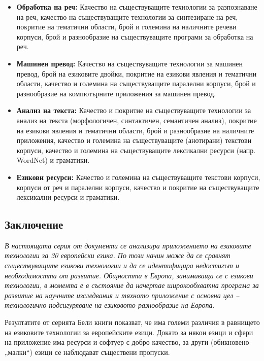 \documentclass[]{../../metanetpaper}
\begin{document}
\begin{multicols}{2}
\begin{itemize}
\item \textbf{Обработка на реч:} Качество на съществуващите технологии
  за разпознаване на реч, качество на съществуващите технологии за
  синтезиране на реч, покритие на тематични области, брой и големина
  на наличните речеви корпуси, брой и разнообразие на съществуващите
  програми за обработка на реч.
\item \textbf{Машинен превод:} Качество на съществуващите технологии
  за машинен превод, брой на езиковите двойки, покритие на езикови
  явления и тематични области, качество и големина на съществуващите
  паралелни корпуси, брой и разнообразие на компютърните приложения за
  машинен превод.
\item \textbf{Анализ на текста:} Качество и покритие на съществуващите
  технологии за анализ на текста (морфологичен, синтактичен,
  семантичен анализ), покритие на езикови явления и тематични области,
  брой и разнообразие на наличните приложения, качество и големина на
  съществуващите (анотирани) текстови корпуси, качество и големина на
  съществуващите лексикални ресурси (напр. WordNet) и граматики.
\item \textbf{Езикови ресурси:} Качество и големина на съществуващите
  текстови корпуси, корпуси от реч и паралелни корпуси, качество и
  покритие на съществуващите лексикални ресурси и граматики.
\end{itemize} 

\subsection{Заключение}

\emph{В настоящата серия от документи се анализира приложението на
  езиковите технологии за 30 европейски езика. По този начин може да
  се сравнят съществуващите езикови технологии и да се идентифицира
  недостигът и необходимостта от развитие. Общността в Европа,
  занимаваща се с езикови технологии, в момента е в състояние да
  начертае широкообхватна програма за развитие на научните изследвания
  и тяхното приложение с основна цел -- технологично подсигуряване на
  езиковото разнообразие на Европа.}

Резултатите от серията Бели книги показват, че има големи различия в равнището на езиковите технологии
за европейските езици. Докато за някои езици и сфери на приложение има
ресурси и софтуер с добро качество, за други (обикновено „малки“)
езици се наблюдават съществени пропуски.


\end{multicols}
\end{document}
